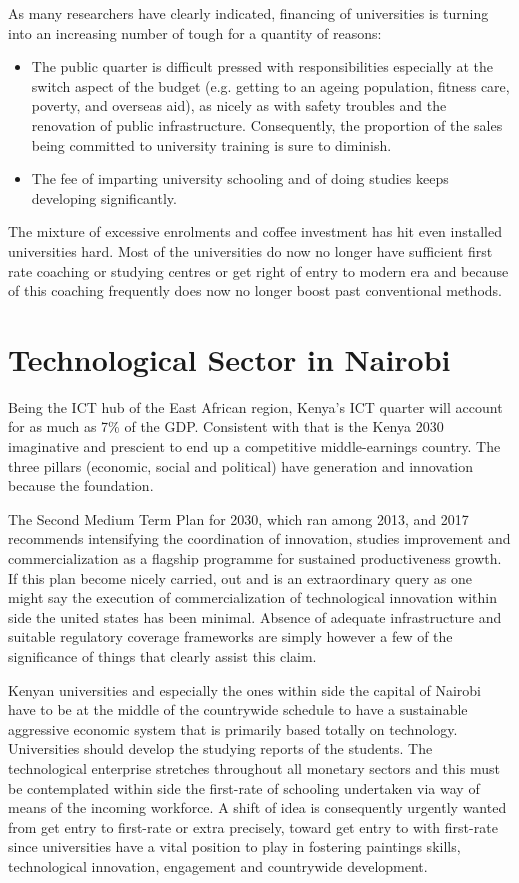 As many researchers have clearly indicated, financing of universities is turning into an increasing number of tough for a quantity of reasons:
\begin{itemize}

    \item The public quarter is difficult pressed with responsibilities especially at the switch aspect of the budget (e.g. getting to an ageing population, fitness care, poverty, and overseas aid), as nicely as with safety troubles and the renovation of public infrastructure. Consequently, the proportion of the sales being committed to university training is sure to diminish.
    \item The fee of imparting university schooling and of doing studies keeps developing significantly.
    
\end{itemize}

The mixture of excessive enrolments and coffee investment has hit even installed universities hard. Most of the universities do now no longer have sufficient first rate coaching or studying centres or get right of entry to modern era and because of this coaching frequently does now no longer boost past conventional methods.

\section{\textbf{Technological Sector in Nairobi}}
Being the ICT hub of the East African region, Kenya’s ICT quarter will account for as much as 7\% of the GDP. Consistent with that is the Kenya 2030 imaginative and prescient to end up a competitive middle-earnings country. The three pillars (economic, social and political) have generation and innovation because the foundation.

The Second Medium Term Plan for 2030, which ran among 2013, and 2017 recommends intensifying the coordination of innovation, studies improvement and commercialization as a flagship programme for sustained productiveness growth. If this plan become nicely carried, out and is an extraordinary query as one might say the execution of commercialization of technological innovation within side the united states has been minimal. Absence of adequate infrastructure and suitable regulatory coverage frameworks are simply however a few of the significance of things that clearly assist this claim.

Kenyan universities and especially the ones within side the capital of Nairobi have to be at the middle of the countrywide schedule to have a sustainable aggressive economic system that is primarily based totally on technology. Universities should develop the studying reports of the students. The technological enterprise stretches throughout all monetary sectors and this must be contemplated within side the first-rate of schooling undertaken via way of means of the incoming workforce. A shift of idea is consequently urgently wanted from get entry to first-rate or extra precisely, toward get entry to with first-rate since universities have a vital position to play in fostering paintings skills, technological innovation, engagement and countrywide development.

